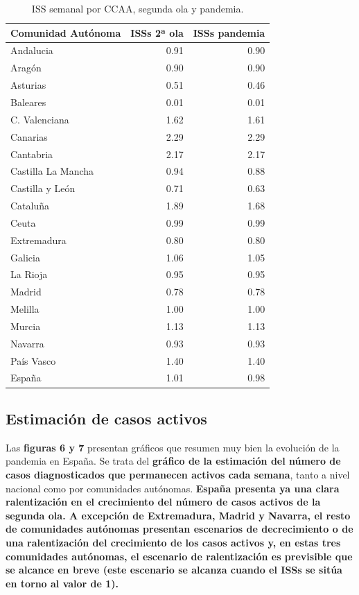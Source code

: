 \documentclass[
  11pt,
]{article}
\begin{document}
\begin{table}[!h]

\caption{\label{tab:tabla3}ISS semanal por CCAA, segunda ola y pandemia.}
\centering
\fontsize{9}{11}\selectfont
\begin{tabular}[t]{l|r|r}
\hline
Comunidad Autónoma & ISSs 2ª ola & ISSs pandemia\\
\hline
Andalucia & 0.91 & 0.90\\
\hline
Aragón & 0.90 & 0.90\\
\hline
Asturias & 0.51 & 0.46\\
\hline
Baleares & 0.01 & 0.01\\
\hline
C. Valenciana & 1.62 & 1.61\\
\hline
Canarias & 2.29 & 2.29\\
\hline
Cantabria & 2.17 & 2.17\\
\hline
Castilla La Mancha & 0.94 & 0.88\\
\hline
Castilla y León & 0.71 & 0.63\\
\hline
Cataluña & 1.89 & 1.68\\
\hline
Ceuta & 0.99 & 0.99\\
\hline
Extremadura & 0.80 & 0.80\\
\hline
Galicia & 1.06 & 1.05\\
\hline
La Rioja & 0.95 & 0.95\\
\hline
Madrid & 0.78 & 0.78\\
\hline
Melilla & 1.00 & 1.00\\
\hline
Murcia & 1.13 & 1.13\\
\hline
Navarra & 0.93 & 0.93\\
\hline
País Vasco & 1.40 & 1.40\\
\hline
España & 1.01 & 0.98\\
\hline
\end{tabular}
\end{table}

\clearpage

\hypertarget{estimaciuxf3n-de-casos-activos}{%
\subsection{Estimación de casos
activos}\label{estimaciuxf3n-de-casos-activos}}

Las \textbf{figuras 6 y 7} presentan gráficos que resumen muy bien la
evolución de la pandemia en España. Se trata del \textbf{gráfico de la
estimación del número de casos diagnosticados que permanecen activos
cada semana}, tanto a nivel nacional como por comunidades autónomas.
\textbf{España presenta ya una clara ralentización en el crecimiento del
número de casos activos de la segunda ola. A excepción de Extremadura,
Madrid y Navarra, el resto de comunidades autónomas presentan escenarios
de decrecimiento o de una ralentización del crecimiento de los casos
activos y, en estas tres comunidades autónomas, el escenario de
ralentización es previsible que se alcance en breve (este escenario se
alcanza cuando el ISSs se sitúa en torno al valor de 1). }
\end{document}
